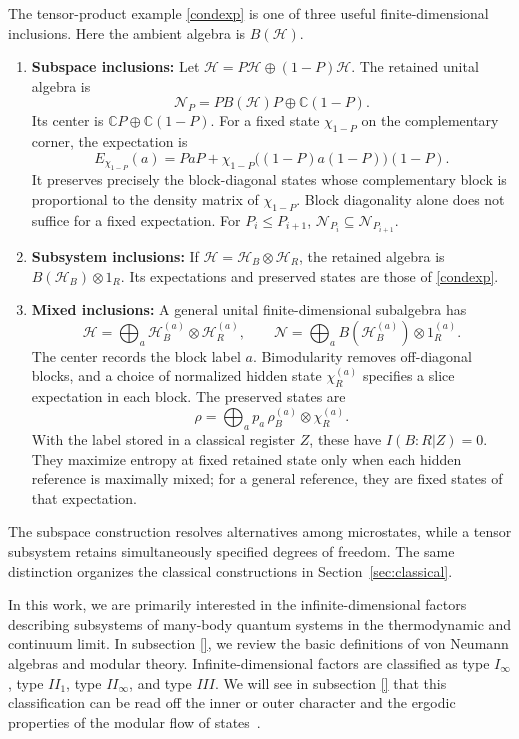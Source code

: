 \documentclass[a4paper,11pt]{article}
\theoremstyle{definition}
\begin{document}
The tensor-product example \eqref{condexp} is one of three useful finite-dimensional
inclusions. Here the ambient algebra is $B(\mathcal H)$.
\begin{enumerate}
 \item {\bf Subspace inclusions:} Let $\mathcal H=P\mathcal H\oplus(1-P)\mathcal H$.
 The retained unital algebra is
 \[
  \mathcal N_P=P B(\mathcal H)P\oplus\mathbb C(1-P).
 \]
 Its center is $\mathbb CP\oplus\mathbb C(1-P)$. For a fixed state $\chi_{1-P}$
 on the complementary corner, the expectation is
 \[
  E_{\chi_{1-P}}(a)=PaP+
  \chi_{1-P}\bigl((1-P)a(1-P)\bigr)(1-P).
 \]
 It preserves precisely the block-diagonal states whose complementary block
 is proportional to the density matrix of $\chi_{1-P}$.
 Block diagonality alone does not suffice for a fixed expectation.
 For $P_i\leq P_{i+1}$, $\mathcal N_{P_i}\subseteq\mathcal N_{P_{i+1}}$.
 \item {\bf Subsystem inclusions:} If $\mathcal H=\mathcal H_B\otimes\mathcal H_R$,
 the retained algebra is $B(\mathcal H_B)\otimes1_R$.
 Its expectations and preserved states are those of \eqref{condexp}.
 \item {\bf Mixed inclusions:} A general unital finite-dimensional subalgebra has
 \[
  \mathcal H=\bigoplus_a\mathcal H_B^{(a)}\otimes\mathcal H_R^{(a)},\qquad
  \mathcal N=\bigoplus_a B(\mathcal H_B^{(a)})\otimes1_R^{(a)}.
 \]
 The center records the block label $a$. Bimodularity removes off-diagonal blocks,
 and a choice of normalized hidden state $\chi_R^{(a)}$ specifies a slice
 expectation in each block. The preserved states are
 \[
  \rho=\bigoplus_a p_a\,\rho_B^{(a)}\otimes\chi_R^{(a)}.
 \]
 With the label stored in a classical register $Z$, these have $I(B:R|Z)=0$.
 They maximize entropy at fixed retained state only when each hidden reference
 is maximally mixed; for a general reference, they are fixed states of that expectation.
\end{enumerate}
The subspace construction resolves alternatives among microstates, while a tensor
subsystem retains simultaneously specified degrees of freedom. The same distinction
organizes the classical constructions in Section~\ref{sec:classical}.

In this work, we are primarily interested in the infinite-dimensional factors describing subsystems of many-body quantum systems in the thermodynamic and continuum limit. In subsection \ref{}, we review the basic definitions of von Neumann algebras and modular theory. Infinite-dimensional factors are classified as type $I_\infty$, type $II_1$, type $II_\infty$, and type $III$. We will see in subsection \ref{} that this classification can be read off the inner or outer character and the ergodic properties of the modular flow of states~\cite{Takesaki1970,Connes1973}. 
\end{document}
